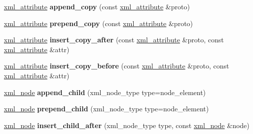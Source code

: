 \begin{DoxyCompactItemize}
\item 
\hypertarget{classpugi_1_1xml__node_a4c151e6665c6bfa614fe80d177fd5396}{\hyperlink{classpugi_1_1xml__attribute}{xml\-\_\-attribute} {\bfseries append\-\_\-copy} (const \hyperlink{classpugi_1_1xml__attribute}{xml\-\_\-attribute} \&proto)}\label{classpugi_1_1xml__node_a4c151e6665c6bfa614fe80d177fd5396}

\item 
\hypertarget{classpugi_1_1xml__node_abd0f80e4d5bc938a27b50d37a0c7865b}{\hyperlink{classpugi_1_1xml__attribute}{xml\-\_\-attribute} {\bfseries prepend\-\_\-copy} (const \hyperlink{classpugi_1_1xml__attribute}{xml\-\_\-attribute} \&proto)}\label{classpugi_1_1xml__node_abd0f80e4d5bc938a27b50d37a0c7865b}

\item 
\hypertarget{classpugi_1_1xml__node_ab5fd2ccada30141544b12c6ef554d8f4}{\hyperlink{classpugi_1_1xml__attribute}{xml\-\_\-attribute} {\bfseries insert\-\_\-copy\-\_\-after} (const \hyperlink{classpugi_1_1xml__attribute}{xml\-\_\-attribute} \&proto, const \hyperlink{classpugi_1_1xml__attribute}{xml\-\_\-attribute} \&attr)}\label{classpugi_1_1xml__node_ab5fd2ccada30141544b12c6ef554d8f4}

\item 
\hypertarget{classpugi_1_1xml__node_ac81f8aded4b53a9b8c98d131986cb535}{\hyperlink{classpugi_1_1xml__attribute}{xml\-\_\-attribute} {\bfseries insert\-\_\-copy\-\_\-before} (const \hyperlink{classpugi_1_1xml__attribute}{xml\-\_\-attribute} \&proto, const \hyperlink{classpugi_1_1xml__attribute}{xml\-\_\-attribute} \&attr)}\label{classpugi_1_1xml__node_ac81f8aded4b53a9b8c98d131986cb535}

\item 
\hypertarget{classpugi_1_1xml__node_a190f4851bb4bc4bb61c89fffb663a9af}{\hyperlink{classpugi_1_1xml__node}{xml\-\_\-node} {\bfseries append\-\_\-child} (xml\-\_\-node\-\_\-type type=node\-\_\-element)}\label{classpugi_1_1xml__node_a190f4851bb4bc4bb61c89fffb663a9af}

\item 
\hypertarget{classpugi_1_1xml__node_a9e0a6dddfe1fefc74bb2b7689376989c}{\hyperlink{classpugi_1_1xml__node}{xml\-\_\-node} {\bfseries prepend\-\_\-child} (xml\-\_\-node\-\_\-type type=node\-\_\-element)}\label{classpugi_1_1xml__node_a9e0a6dddfe1fefc74bb2b7689376989c}

\item 
\hypertarget{classpugi_1_1xml__node_a4dd8d25c02560a2692c43cc4779fb7e3}{\hyperlink{classpugi_1_1xml__node}{xml\-\_\-node} {\bfseries insert\-\_\-child\-\_\-after} (xml\-\_\-node\-\_\-type type, const \hyperlink{classpugi_1_1xml__node}{xml\-\_\-node} \&node)}\label{classpugi_1_1xml__node_a4dd8d25c02560a2692c43cc4779fb7e3}


\end{DoxyCompactItemize}
